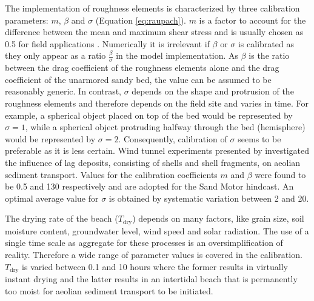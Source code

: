 
The implementation of roughness elements is characterized by three
calibration parameters: $m$, $\beta$ and $\sigma$ (Equation
\ref{eq:raupach}). $m$ is a factor to account for the difference
between the mean and maximum shear stress and is usually chosen as 0.5
for field applications \citep{Raupach1993,
  McKennaNeuman2012}. Numerically it is irrelevant if $\beta$ or
$\sigma$ is calibrated as they only appear as a ratio
$\frac{\beta}{\sigma}$ in the model implementation. As $\beta$ is the
ratio between the drag coefficient of the roughness elements alone and
the drag coefficient of the unarmored sandy bed, the value can be
assumed to be reasonably generic. In contrast, $\sigma$ depends on the
shape and protrusion of the roughness elements and therefore depends
on the field site and varies in time. For example, a spherical object
placed on top of the bed would be represented by $\sigma = 1$, while a
spherical object protruding halfway through the bed (hemisphere) would
be represented by $\sigma = 2$. Consequently, calibration of $\sigma$
seems to be preferable as it is less certain. Wind tunnel experiments
presented by \citet{McKennaNeuman2012} investigated the influence of
lag deposits, consisting of shells and shell fragments, on aeolian
sediment transport. Values for the calibration coefficients $m$ and
$\beta$ were found to be 0.5 and 130 respectively and are adopted for
the Sand Motor hindcast. An optimal average value for $\sigma$ is
obtained by systematic variation between 2 and 20.

The drying rate of the beach ($T_{\mathrm{dry}}$) depends on many
factors, like grain size, soil moisture content, groundwater level,
wind speed and solar radiation. The use of a single time scale as
aggregate for these processes is an oversimplification of
reality. Therefore a wide range of parameter values is covered in the
calibration. $T_{\mathrm{dry}}$ is varied between 0.1 and 10 hours
where the former results in virtually instant drying and the latter
results in an intertidal beach that is permanently too moist for
aeolian sediment transport to be initiated.

